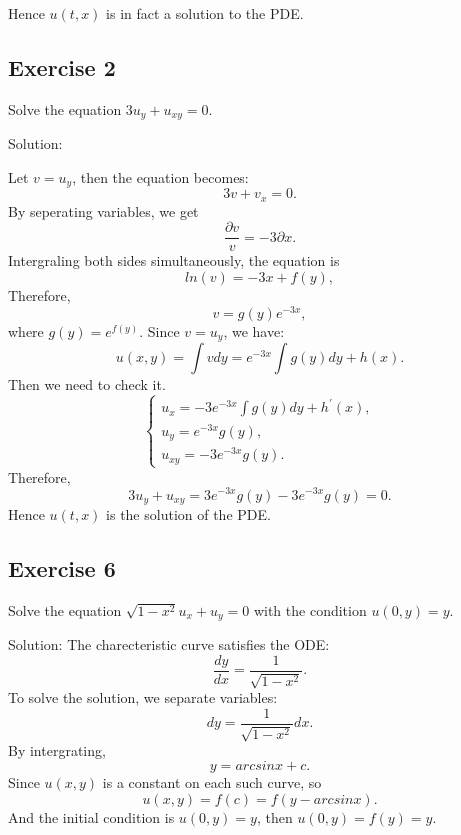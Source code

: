 \documentclass{article}
\begin{document}
			Hence $u(t,x)$ is in fact a solution to the PDE.

		\subsection{Exercise 2}
		Solve the equation $3u_y + u_{xy} =0.$

			Solution:

			Let $v=u_y$, then the equation becomes:
			\[3v+v_x=0.\]
			By seperating variables, we get \[\frac{\partial v}{v}=-3\partial x.\]
			Intergraling both sides simultaneously, the equation is \[ ln(v) = -3x + f(y),  \]
			Therefore, \[ v = g(y)e^{-3x},\]
			where $g(y)=e^{f(y)}$.
			Since $v=u_y$, we have:
			\[u(x,y)=\int vdy = e^{-3x}\int g(y)dy + h(x).\]
			Then we need to check it.
			\begin{equation*}
				\begin{cases}
					u_{x}=-3e^{-3x}\int g(y)dy + h^{'}(x),
					\\
					u_{y}=e^{-3x} g(y),
					\\
					u_{xy}=-3e^{-3x} g(y).
				\end{cases}
			\end{equation*}
			Therefore, \[3u_y + u_{xy}=3e^{-3x} g(y)-3e^{-3x} g(y)=0.\]
            Hence $u(t,x)$ is the solution of the PDE.


    \subsection{Exercise 6}
	Solve the equation $\sqrt{1-x^2}u_x+u_y=0$ with the condition $u(0, y)=y.$
		
            Solution: The charecteristic curve satisfies the ODE: 
            \[ \frac{dy}{dx}=\frac{1}{\sqrt{1-x^2}}.\]
			To solve the solution, we separate variables: 		
			\[ dy=\frac{1}{\sqrt{1-x^2}}dx.\]
			By intergrating, \[y= arcsinx + c .\]
			Since $u(x,y)$ is a constant on each such curve, so
			\[ u(x,y)=f(c)=f(y - arcsinx).\]
			And the initial condition is $u(0,y)=y$, then $u(0,y)=f(y)=y.$
\end{document}
